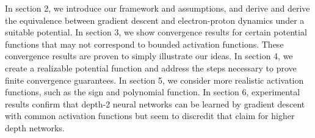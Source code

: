 In section 2, we introduce our framework and assumptions, and derive
and derive the equivalence between gradient descent and
electron-proton dynamics under a suitable potential. In section 3, we show convergence results for certain potential functions that may not correspond to bounded activation functions. These convergence results are proven to simply illustrate our ideas. In section 4, we create a realizable potential function and address the steps necessary to prove finite convergence guarantees. In section 5, we consider more realistic activation functions, such as the sign and polynomial function. In section 6, experimental
results confirm that depth-2 neural networks can be learned by
gradient descent with common activation functions but seem to
discredit that claim for higher depth networks.

